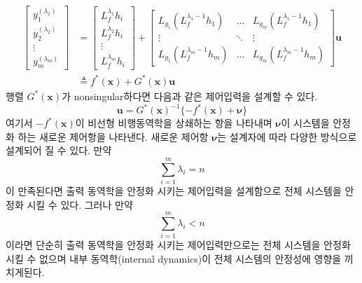 \documentclass[a4paper, 12pt]{report}
\begin{document}
	\begin{equation}\label{Eq:output_dyn}
		\begin{split}
			\begin{bmatrix}
				y_{1}^{(\lambda_{1})} \\
				y_{2}^{(\lambda_{2})} \\
				\vdots \\
				y_{m}^{(\lambda_{m})}
			\end{bmatrix}
			&=
			\begin{bmatrix}
				L_{f}^{\lambda_{1}}h_{i} \\
				L_{f}^{\lambda_{2}}h_{i} \\
				\vdots \\
				L_{f}^{\lambda_{m}}h_{i}
			\end{bmatrix}
			+
			\begin{bmatrix}
				L_{g_{1}}( L_{f}^{\lambda_{1}-1}h_{1} ) & \dots & L_{g_{m}}( L_{f}^{\lambda_{1}-1}h_{1} ) \\
				\vdots & \ddots & \vdots \\
				L_{g_{1}}( L_{f}^{\lambda_{m}-1}h_{m} ) & \dots & L_{g_{m}}( L_{f}^{\lambda_{m}-1}h_{m} )
			\end{bmatrix}
			\mathbf{u} \\
			&\triangleq f^{*}(\mathbf{x}) + G^{*}(\mathbf{x})\mathbf{u}
		\end{split}
	\end{equation}
	행렬 $G^{*}(\mathbf{x})$가 nonsingular하다면 다음과 같은 제어입력을 설계할 수 있다.
	\begin{equation}\label{Eq:NDI_input1}
		\mathbf{u} = G^{*}(\mathbf{x})^{-1}\{ -f^{*}(\mathbf{x}) + \boldsymbol{\nu} \}
	\end{equation}
	여기서 $-f^{*}(\mathbf{x})$이 비선형 비행동역학을 상쇄하는 항을 나타내며 $\boldsymbol{\nu}$이 시스템을 안정화 하는 새로운 제어항을 나타낸다. 새로운 제어항 $\boldsymbol{\nu}$는 설계자에 따라 다양한 방식으로 설계되어 질 수 있다. 만약
	\begin{equation}\label{Eq:rela_deg_full}
		\sum_{i=1}^{m}\lambda_{i} = n
	\end{equation}
	이 만족된다면 출력 동역학을 안정화 시키는 제어입력을 설계함으로 전체 시스템을 안정화 시킬 수 있다. 그러나 만약
	\begin{equation}
		\sum_{i=1}^{m}\lambda_{i} < n
	\end{equation}
	이라면 단순히 출력 동역학을 안정화 시키는 제어입력만으로는 전체 시스템을 안정화 시킬 수 없으며 내부 동역학(internal dynamics)이 전체 시스템의 안정성에 영향을 끼치게된다.
	
\end{document}
